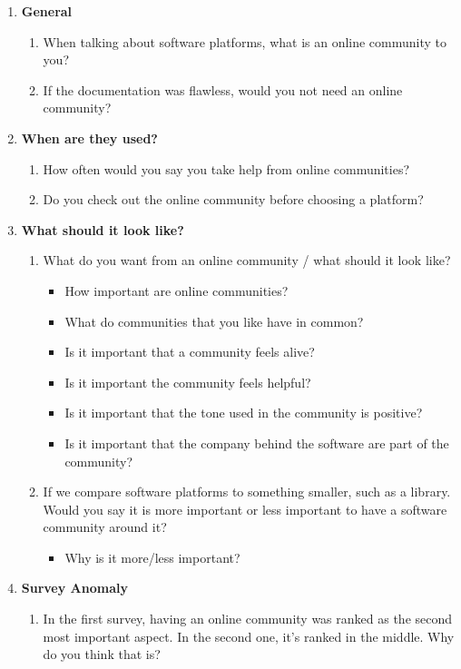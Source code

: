 \documentclass{article}
\begin{document}
\begin{enumerate}[label=C\Alph*]
\item \textbf{General}
\begin{enumerate}[label={CA\arabic*}]
\item    When talking about software platforms, what is an online community to you?
\item    If the documentation was flawless, would you not need an online community?
\end{enumerate}
\item \textbf{When are they used?}
\begin{enumerate}[label={CB\arabic*}]
\item    How often would you say you take help from online communities?
\item   Do you check out the online community before choosing a platform?
\end{enumerate}
\item \textbf{What should it look like?}

\begin{enumerate}[label=CC\arabic*]
\item    What do you want from an online community / what should it look like?
\begin{itemize}[label={-}]
\item How important are online communities?
\item What do communities that you like have in common?
\item Is it important that a community feels alive?
\item Is it important the community feels helpful?
\item Is it important that the tone used in the community is positive?
\item Is it important that the company behind the software are part of the community?
\end{itemize}
\item    If we compare software platforms to something smaller, such as a library. Would you say it is more important or less important to have a software community around it?
\begin{itemize}[label={-}]
\item Why is it more/less important?
\end{itemize}
\end{enumerate}
\item \textbf{Survey Anomaly}
\begin{enumerate}[label={CD\arabic*}]
\item In the first survey, having an online community was ranked as the second most important aspect. In the second one, it’s ranked in the middle. Why do you think that is?
\end{enumerate}
\end{enumerate}
\end{document}
